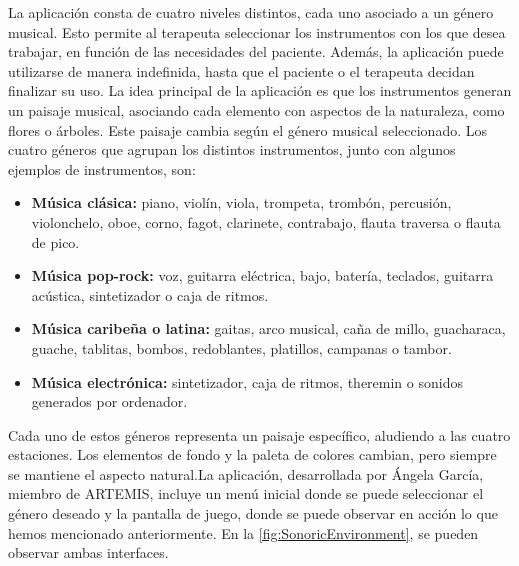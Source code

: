 La aplicación consta de cuatro niveles distintos, cada uno asociado a un género musical. Esto permite al terapeuta seleccionar los instrumentos con los que desea trabajar, en función de las necesidades del paciente. Además, la aplicación puede utilizarse de manera indefinida, hasta que el paciente o el terapeuta decidan finalizar su uso. La idea principal de la aplicación es que los instrumentos generan un paisaje musical, asociando cada elemento con aspectos de la naturaleza, como flores o árboles. Este paisaje cambia según el género musical seleccionado. Los cuatro géneros que agrupan los distintos instrumentos, junto con algunos ejemplos de instrumentos, son:

\begin{itemize}
	\item \textbf{Música clásica:} piano, violín, viola, trompeta, trombón, percusión, violonchelo, oboe, corno, fagot, clarinete, contrabajo, flauta traversa o flauta de pico.
	\item \textbf{Música pop-rock:} voz, guitarra eléctrica, bajo, batería, teclados, guitarra acústica, sintetizador o caja de ritmos.
	\item \textbf{Música caribeña o latina:} gaitas, arco musical, caña de millo, guacharaca, guache, tablitas, bombos, redoblantes, platillos, campanas o tambor.
	\item \textbf{Música electrónica:} sintetizador, caja de ritmos, theremin o sonidos generados por ordenador.
\end{itemize}

Cada uno de estos géneros representa un paisaje específico, aludiendo a las cuatro estaciones. Los elementos de fondo y la paleta de colores cambian, pero siempre se mantiene el aspecto natural.La aplicación, desarrollada por Ángela García, miembro de ARTEMIS, incluye un menú inicial donde se puede seleccionar el género deseado y la pantalla de juego, donde se puede observar en acción lo que hemos mencionado anteriormente. En la \autoref{fig:SonoricEnvironment}, se pueden observar ambas interfaces.

